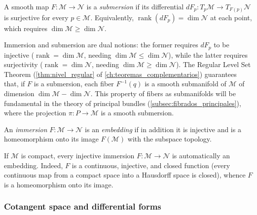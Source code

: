 \begin{definition}\label{def:submersion_suave}
A smooth map $F: \mathcal{M} \to \mathcal{N}$ is a \textit{submersion} if its differential $dF_p: T_p\mathcal{M} \to T_{F(p)}\mathcal{N}$ is surjective for every $p \in \mathcal{M}$. Equivalently, $\operatorname{rank}(dF_p) = \dim \mathcal{N}$ at each point, which requires $\dim \mathcal{M} \geq \dim \mathcal{N}$.
\end{definition}

\begin{remark}\label{rem:inmersion_submersion_dualidad}
Immersion and submersion are dual notions: the former requires $dF_p$ to be injective ($\operatorname{rank} = \dim \mathcal{M}$, needing $\dim \mathcal{M} \leq \dim \mathcal{N}$), while the latter requires surjectivity ($\operatorname{rank} = \dim \mathcal{N}$, needing $\dim \mathcal{M} \geq \dim \mathcal{N}$). The Regular Level Set Theorem (\autoref{thm:nivel_regular} of \autoref{ch:teoremas_complementarios}) guarantees that, if $F$ is a submersion, each fiber $F^{-1}(q)$ is a smooth submanifold of $\mathcal{M}$ of dimension $\dim \mathcal{M} - \dim \mathcal{N}$. This property of fibers as submanifolds will be fundamental in the theory of principal bundles (\autoref{subsec:fibrados_principales}), where the projection $\pi: P \to \mathcal{M}$ is a smooth submersion.
\end{remark}

\begin{definition}\label{def:embebimiento_suave}
An \textit{immersion} $F: \mathcal{M} \to \mathcal{N}$ is an \textit{embedding} if in addition it is injective and is a homeomorphism onto its image $F(\mathcal{M})$ with the subspace topology.
\end{definition}

\begin{remark}\label{rem:compacta_inmersion_embebimiento}
If $\mathcal{M}$ is compact, every injective immersion $F: \mathcal{M} \to \mathcal{N}$ is automatically an embedding. Indeed, $F$ is a continuous, injective, and closed function (every continuous map from a compact space into a Hausdorff space is closed), whence $F$ is a homeomorphism onto its image.
\end{remark}

\subsubsection{Cotangent space and differential forms}\label{subsubsec:espacio_cotangente}

